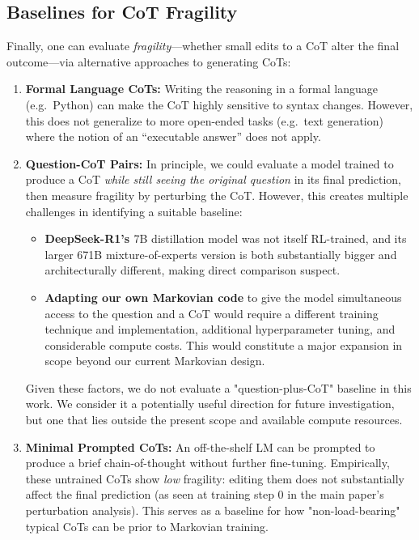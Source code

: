 \documentclass{article}
\begin{document}
\subsection{Baselines for CoT Fragility}
\label{app:baselines_fragility}

Finally, one can evaluate \emph{fragility}---whether small edits to a CoT alter the final outcome---via alternative approaches to generating CoTs:

\begin{enumerate}
    \item \textbf{Formal Language CoTs:}
    Writing the reasoning in a formal language (e.g.\ Python) can make the CoT highly sensitive to syntax changes. However, this does not generalize to more open-ended tasks (e.g.\ text generation) where the notion of an ``executable answer'' does not apply.

\item \textbf{Question-CoT Pairs:}
In principle, we could evaluate a model trained to produce a CoT \emph{while still seeing the original question} in its final prediction, then measure fragility by perturbing the CoT. However, this creates multiple challenges in identifying a suitable baseline:
\begin{itemize}
    \item \textbf{DeepSeek-R1's \citep{deepseekai2025}} 7B distillation model was not itself RL-trained, and its larger 671B mixture-of-experts version is both substantially bigger and architecturally different, making direct comparison suspect.
    \item \textbf{Adapting our own Markovian code} to give the model simultaneous access to the question and a CoT would require a different training technique and implementation, additional hyperparameter tuning, and considerable compute costs. This would constitute a major expansion in scope beyond our current Markovian design.
\end{itemize}
Given these factors, we do not evaluate a "question-plus-CoT" baseline in this work. We consider it a potentially useful direction for future investigation, but one that lies outside the present scope and available compute resources.

    \item \textbf{Minimal Prompted CoTs:}
    An off-the-shelf LM can be prompted to produce a brief chain-of-thought without further fine-tuning. Empirically, these untrained CoTs show \emph{low} fragility: editing them does not substantially affect the final prediction (as seen at training step 0 in the main paper's perturbation analysis). This serves as a baseline for how "non-load-bearing" typical CoTs can be prior to Markovian training.
\end{enumerate}
\end{document}
